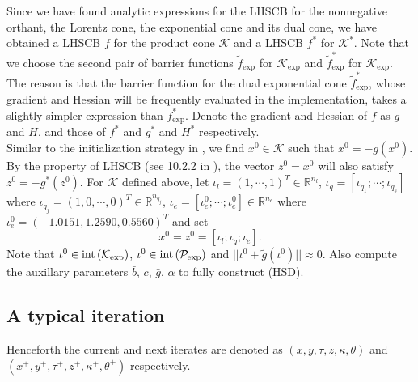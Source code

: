 \documentclass[11pt]{article}
\theoremstyle{definition}
\theoremstyle{plain}
\def\interior{\protect{\textnormal{int}}}
\begin{document}
Since we have found analytic expressions for the LHSCB for the nonnegative orthant, the Lorentz cone, the exponential cone and its dual cone, we have obtained a LHSCB $f$ for the product cone $\mathcal{K}$ and a LHSCB $f^*$ for $\mathcal{K}^*$. Note that we choose the second pair of barrier functions $\tilde{f}_{\exp}$ for $\mathcal{K}_{\exp}$ and $\tilde{f}^*_{\exp}$ for $\mathcal{K}_{\exp}$. The reason is that the barrier function for the dual exponential cone $\tilde{f}_{\exp}^*$, whose gradient and Hessian will be frequently evaluated in the implementation, takes a slightly simpler expression than $f_{\exp}^*$.
Denote the gradient and Hessian of $f$ as $g$ and $H$, and those of $f^*$ and $g^*$ and $H^*$ respectively. \\

Similar to the initialization strategy in \cite{Akle_thesis}, we find $x^0 \in \mathcal{K}$ such that $x^0 = -g(x^0)$. By the property of LHSCB (see 10.2.2 in \cite{Robert_thesis}), the vector $z^0=x^0$ will also satisfy $z^0 = -g^*(z^0)$. For $\mathcal{K}$ defined above, let $\iota_l = (1,\cdots,1)^T \in \mathbb{R}^{n_l}$, $\iota_q = [\iota_{q_1}; \cdots; \iota_{q_s}]$ where $\iota_{q_j} = (1,0,\cdots, 0)^T \in \mathbb{R}^{n_{q_j}}$, $\iota_e = [\iota^0_e; \cdots; \iota^0_e]\in \mathbb{R}^{n_e}$ where $\iota_e^0 = (-1.0151, 1.2590, 0.5560)^T$ and set
\[x^0 = z^0 = [\iota_l; \iota_q; \iota_e].\]
Note that $\iota^0 \in \interior \left(\mathcal{K}_{\exp}\right)$, $\iota^0 \in \interior\left(\mathcal{P}_{\exp}\right)$ and $||\iota^0 + \tilde{g}(\iota^0)|| \approx 0$. Also compute the auxillary parameters $\bar{b}$, $\bar{c}$, $\bar{g}$, $\bar{\alpha}$ to fully construct (HSD).

\subsection{A typical iteration}\label{A_typical_iteration}
Henceforth the current and next iterates are denoted as  $(x,y, \tau, z,\kappa, \theta)$ and  $(x^+, y^+, \tau^+, z^+,\kappa^+, \theta^+)$ respectively. \\
\end{document}
